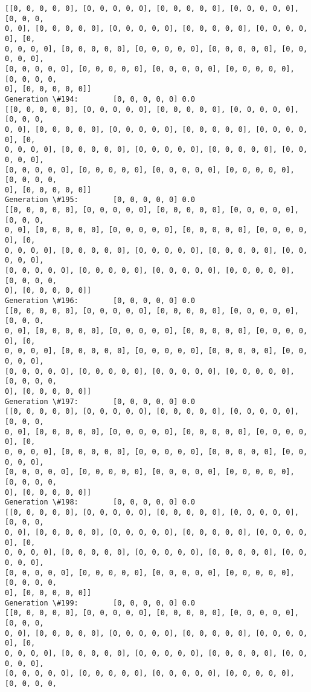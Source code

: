 \documentclass[11pt]{article}
\begin{document}
\begin{Verbatim}[commandchars=\\\{\}]
[[0, 0, 0, 0, 0], [0, 0, 0, 0, 0], [0, 0, 0, 0, 0], [0, 0, 0, 0, 0], [0, 0, 0,
0, 0], [0, 0, 0, 0, 0], [0, 0, 0, 0, 0], [0, 0, 0, 0, 0], [0, 0, 0, 0, 0], [0,
0, 0, 0, 0], [0, 0, 0, 0, 0], [0, 0, 0, 0, 0], [0, 0, 0, 0, 0], [0, 0, 0, 0, 0],
[0, 0, 0, 0, 0], [0, 0, 0, 0, 0], [0, 0, 0, 0, 0], [0, 0, 0, 0, 0], [0, 0, 0, 0,
0], [0, 0, 0, 0, 0]]
Generation \#194:        [0, 0, 0, 0, 0] 0.0
[[0, 0, 0, 0, 0], [0, 0, 0, 0, 0], [0, 0, 0, 0, 0], [0, 0, 0, 0, 0], [0, 0, 0,
0, 0], [0, 0, 0, 0, 0], [0, 0, 0, 0, 0], [0, 0, 0, 0, 0], [0, 0, 0, 0, 0], [0,
0, 0, 0, 0], [0, 0, 0, 0, 0], [0, 0, 0, 0, 0], [0, 0, 0, 0, 0], [0, 0, 0, 0, 0],
[0, 0, 0, 0, 0], [0, 0, 0, 0, 0], [0, 0, 0, 0, 0], [0, 0, 0, 0, 0], [0, 0, 0, 0,
0], [0, 0, 0, 0, 0]]
Generation \#195:        [0, 0, 0, 0, 0] 0.0
[[0, 0, 0, 0, 0], [0, 0, 0, 0, 0], [0, 0, 0, 0, 0], [0, 0, 0, 0, 0], [0, 0, 0,
0, 0], [0, 0, 0, 0, 0], [0, 0, 0, 0, 0], [0, 0, 0, 0, 0], [0, 0, 0, 0, 0], [0,
0, 0, 0, 0], [0, 0, 0, 0, 0], [0, 0, 0, 0, 0], [0, 0, 0, 0, 0], [0, 0, 0, 0, 0],
[0, 0, 0, 0, 0], [0, 0, 0, 0, 0], [0, 0, 0, 0, 0], [0, 0, 0, 0, 0], [0, 0, 0, 0,
0], [0, 0, 0, 0, 0]]
Generation \#196:        [0, 0, 0, 0, 0] 0.0
[[0, 0, 0, 0, 0], [0, 0, 0, 0, 0], [0, 0, 0, 0, 0], [0, 0, 0, 0, 0], [0, 0, 0,
0, 0], [0, 0, 0, 0, 0], [0, 0, 0, 0, 0], [0, 0, 0, 0, 0], [0, 0, 0, 0, 0], [0,
0, 0, 0, 0], [0, 0, 0, 0, 0], [0, 0, 0, 0, 0], [0, 0, 0, 0, 0], [0, 0, 0, 0, 0],
[0, 0, 0, 0, 0], [0, 0, 0, 0, 0], [0, 0, 0, 0, 0], [0, 0, 0, 0, 0], [0, 0, 0, 0,
0], [0, 0, 0, 0, 0]]
Generation \#197:        [0, 0, 0, 0, 0] 0.0
[[0, 0, 0, 0, 0], [0, 0, 0, 0, 0], [0, 0, 0, 0, 0], [0, 0, 0, 0, 0], [0, 0, 0,
0, 0], [0, 0, 0, 0, 0], [0, 0, 0, 0, 0], [0, 0, 0, 0, 0], [0, 0, 0, 0, 0], [0,
0, 0, 0, 0], [0, 0, 0, 0, 0], [0, 0, 0, 0, 0], [0, 0, 0, 0, 0], [0, 0, 0, 0, 0],
[0, 0, 0, 0, 0], [0, 0, 0, 0, 0], [0, 0, 0, 0, 0], [0, 0, 0, 0, 0], [0, 0, 0, 0,
0], [0, 0, 0, 0, 0]]
Generation \#198:        [0, 0, 0, 0, 0] 0.0
[[0, 0, 0, 0, 0], [0, 0, 0, 0, 0], [0, 0, 0, 0, 0], [0, 0, 0, 0, 0], [0, 0, 0,
0, 0], [0, 0, 0, 0, 0], [0, 0, 0, 0, 0], [0, 0, 0, 0, 0], [0, 0, 0, 0, 0], [0,
0, 0, 0, 0], [0, 0, 0, 0, 0], [0, 0, 0, 0, 0], [0, 0, 0, 0, 0], [0, 0, 0, 0, 0],
[0, 0, 0, 0, 0], [0, 0, 0, 0, 0], [0, 0, 0, 0, 0], [0, 0, 0, 0, 0], [0, 0, 0, 0,
0], [0, 0, 0, 0, 0]]
Generation \#199:        [0, 0, 0, 0, 0] 0.0
[[0, 0, 0, 0, 0], [0, 0, 0, 0, 0], [0, 0, 0, 0, 0], [0, 0, 0, 0, 0], [0, 0, 0,
0, 0], [0, 0, 0, 0, 0], [0, 0, 0, 0, 0], [0, 0, 0, 0, 0], [0, 0, 0, 0, 0], [0,
0, 0, 0, 0], [0, 0, 0, 0, 0], [0, 0, 0, 0, 0], [0, 0, 0, 0, 0], [0, 0, 0, 0, 0],
[0, 0, 0, 0, 0], [0, 0, 0, 0, 0], [0, 0, 0, 0, 0], [0, 0, 0, 0, 0], [0, 0, 0, 0,

\end{Verbatim}
\end{document}
